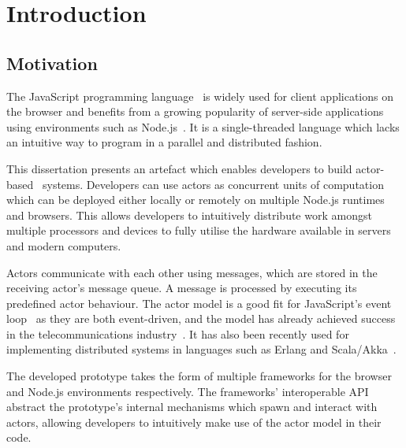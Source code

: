 \documentclass[oneside]{um-fict}
\begin{document}
\tableofcontents*\if@openright\cleardoublepage\else\clearpage\fi
\listoffigures*\if@openright\cleardoublepage\else\clearpage
\listoftables*\if@openright\cleardoublepage\else\clearpage\begin{figure}
    
\end{figure}
\mainmatter
\chapter{Introduction}\label{chap:intro}
\section{Motivation}
The JavaScript programming language~\cite{ecmascript} is widely used for client applications on the browser and benefits from a growing popularity of server-side applications using environments such as Node.js~\cite{nodejs}. It is a single-threaded language which lacks an intuitive way to program in a parallel and distributed fashion. 

This dissertation presents an artefact which enables developers to build actor-based~\cite{hewitt1973session, 43years} systems. Developers can use actors as concurrent units of computation which can be deployed either locally or remotely on multiple Node.js runtimes and browsers. This allows developers to intuitively distribute work amongst multiple processors and devices to fully utilise the hardware available in servers and modern computers.

Actors communicate with each other using messages, which are stored in the receiving actor's message queue. A message is processed by executing its predefined actor behaviour. The actor model is a good fit for JavaScript's event loop~\cite{eventloopbrowser, eventloopnode} as they are both event-driven, and the model has already achieved success in the telecommunications industry~\cite{erlang}. It has also been recently used for implementing distributed systems in languages such as Erlang and Scala/Akka~\cite{haller2012integration}.

The developed prototype takes the form of multiple frameworks for the browser and Node.js environments respectively. The frameworks' interoperable API abstract the prototype's internal mechanisms which spawn and interact with actors, allowing developers to intuitively make use of the actor model in their code.
\end{document}

